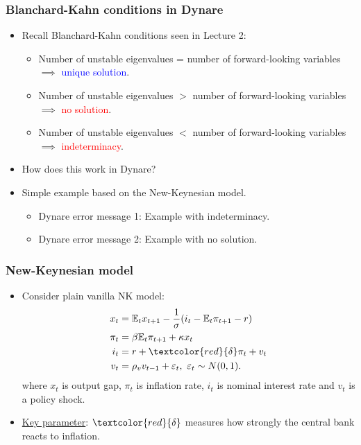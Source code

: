 \documentclass{beamer}
\newcommand{\eps}{\varepsilon}
\newcommand{\E}{\mathbb{E}}
\begin{document}
\begin{frame}
\frametitle{Blanchard-Kahn conditions in Dynare}

\begin{itemize}
	\item Recall Blanchard-Kahn conditions seen in Lecture 2:
	
	\begin{itemize}
		\item Number of unstable eigenvalues = number of forward-looking variables $ \implies $ \textcolor{blue}{unique solution}.
		\item Number of unstable eigenvalues $ > $ number of forward-looking variables $ \implies $ \textcolor{red}{no solution}.
		\item Number of unstable eigenvalues $ < $ number of forward-looking variables $ \implies $ \textcolor{red}{indeterminacy}.
	\end{itemize}
	
	\item How does this work in Dynare?
	\item Simple example based on the New-Keynesian model.
	\begin{itemize}
		\item Dynare error message 1: Example with indeterminacy.
		
		\item Dynare error message 2: Example with no solution.
	\end{itemize}
\end{itemize}

\end{frame}


\begin{frame}
\frametitle{New-Keynesian model}

\begin{itemize}
\item Consider plain vanilla NK model:
\begin{align*}
x_{t} &= \E_{t}x_{t+1} -\frac{1}{\sigma} (i_{t}-\E_{t}\pi_{t+1}-r) \\
\pi_{t} &= \beta \E_{t}\pi_{t+1}+\kappa x_{t} \\
i_{t} &= r+\textcolor{red}{\delta} \pi_{t}+v_{t} \\
v_{t} &= \rho_{v}v_{t-1}+\eps_{t}, \ \eps_{t}\sim N(0,1).
\end{align*}
where $ x_{t} $ is output gap, $ \pi_{t} $ is inflation rate, $ i_{t} $ is nominal interest rate and $ v_{t} $ is a policy shock.
\item \underline{Key parameter}: $ \textcolor{red}{\delta} $ measures how strongly the central bank reacts to inflation.

\end{itemize}

\end{frame}
\end{document}
